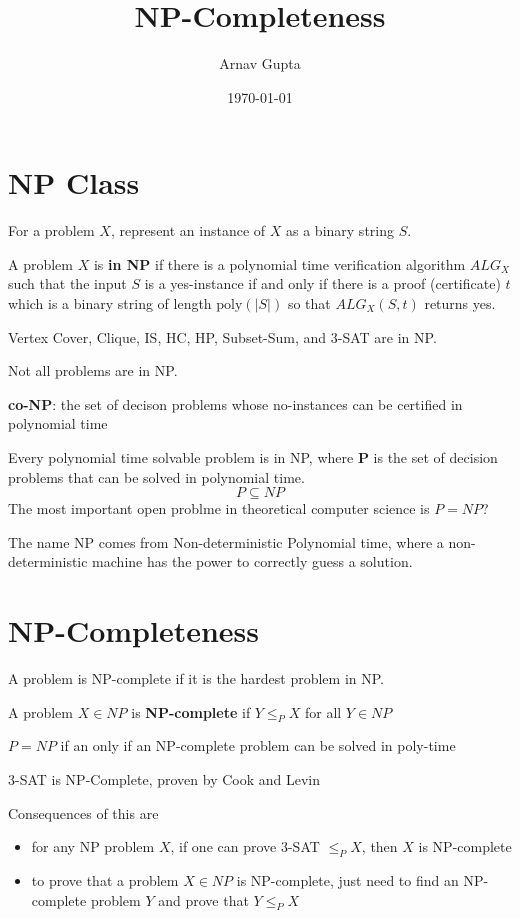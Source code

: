 \documentclass[11pt]{article}
\author{Arnav Gupta}
\date{\today}
\title{NP-Completeness}
\begin{document}
\maketitle
\tableofcontents

\section{NP Class}
\label{sec:org5e36904}
For a problem \(X\), represent an instance of \(X\) as a binary string \(S\).

A problem \(X\) is \textbf{in NP} if there is a polynomial time verification algorithm \(ALG_{X}\) such that
the input \(S\) is a yes-instance if and only if there is a proof (certificate) \(t\) which is a binary
string of length \(\text{poly}(|S|)\) so that \(ALG_{X}(S,t)\) returns yes.

Vertex Cover, Clique, IS, HC, HP, Subset-Sum, and 3-SAT are in NP.

Not all problems are in NP.

\textbf{co-NP}: the set of decison problems whose no-instances can be certified in polynomial time

Every polynomial time solvable problem is in NP, where \textbf{P} is the set of decision problems that
can be solved in polynomial time.
$$
P \subseteq NP
$$
The most important open problme in theoretical computer science is \(P = NP\)?

The name NP comes from Non-deterministic Polynomial time, where a non-deterministic machine
has the power to correctly guess a solution.
\section{NP-Completeness}
\label{sec:org537a92c}
A problem is NP-complete if it is the hardest problem in NP.

A problem \(X \in NP\) is \textbf{NP-complete} if \(Y \le_{P} X\) for all \(Y \in NP\)

\(P = NP\) if an only if an NP-complete problem can be solved in poly-time

3-SAT is NP-Complete, proven by Cook and Levin

Consequences of this are
\begin{itemize}
\item for any NP problem \(X\), if one can prove 3-SAT \(\le_{P} X\), then \(X\) is NP-complete
\item to prove that a problem \(X \in NP\) is NP-complete, just need to find an NP-complete problem
\(Y\) and prove that \(Y \le_{P} X\)
\end{itemize}
\end{document}
